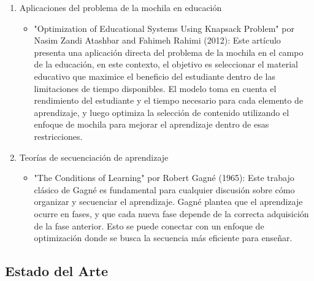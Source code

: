 \documentclass{article}
\begin{document}
\begin{enumerate}
\begin{itemize}
    \end{itemize}
    \item  Aplicaciones del problema de la mochila en educación
    \begin{itemize}
        \item "Optimization of Educational Systems Using Knapsack Problem" por Nasim Zandi Atashbar and Fahimeh Rahimi (2012): Este artículo presenta una aplicación directa del problema de la mochila en el campo de la educación, en este contexto, el objetivo es seleccionar el material educativo que maximice el beneficio del estudiante dentro de las limitaciones de tiempo disponibles. El modelo toma en cuenta el rendimiento del estudiante y el tiempo necesario para cada elemento de aprendizaje, y luego optimiza la selección de contenido utilizando el enfoque de mochila para mejorar el aprendizaje dentro de esas restricciones.
    \end{itemize}
    \item Teorías de secuenciación de aprendizaje
    \begin{itemize}
        \item "The Conditions of Learning" por Robert Gagné (1965): Este trabajo clásico de Gagné es fundamental para cualquier discusión sobre cómo organizar y secuenciar el aprendizaje. Gagné plantea que el aprendizaje ocurre en fases, y que cada nueva fase depende de la correcta adquisición de la fase anterior. Esto se puede conectar con un enfoque de optimización donde se busca la secuencia más eficiente para enseñar.
    \end{itemize}
\end{enumerate}

\subsection{Estado del Arte}
\end{document}
